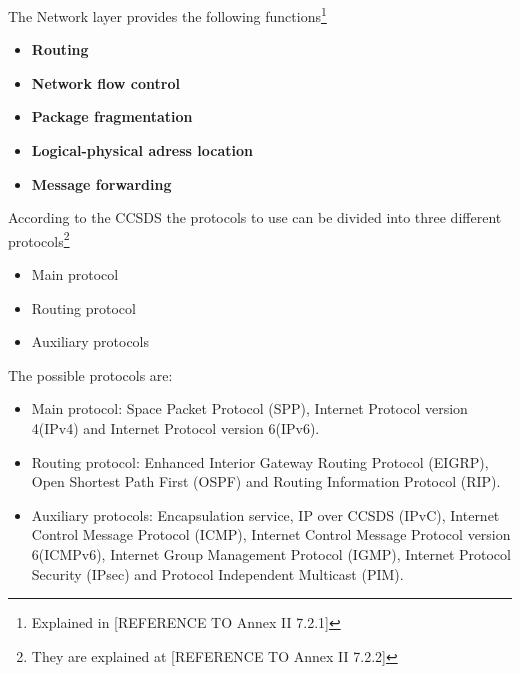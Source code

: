 The Network layer provides the following functions\footnote{Explained in [REFERENCE TO Annex II 7.2.1]}

\begin{itemize}
\item \textbf{Routing}
\item \textbf{Network flow control}
\item \textbf{Package fragmentation}
\item \textbf{Logical-physical adress location}
\item \textbf{Message forwarding}
\end{itemize}

According to the CCSDS the protocols to use can be divided into three different protocols\footnote{They are explained at [REFERENCE TO Annex II 7.2.2]} 

\begin{itemize}
\item Main protocol
\item Routing protocol
\item Auxiliary protocols
\end{itemize}

The possible protocols are:

\begin{itemize}
\item Main protocol: Space Packet Protocol (SPP), Internet Protocol version 4(IPv4) and Internet Protocol version 6(IPv6).
\item Routing protocol: Enhanced Interior Gateway Routing Protocol (EIGRP), Open Shortest Path First (OSPF) and Routing Information Protocol (RIP).
\item Auxiliary protocols: Encapsulation service, IP over CCSDS (IPvC), Internet Control Message Protocol (ICMP), Internet Control Message Protocol version 6(ICMPv6), Internet Group Management Protocol (IGMP), Internet Protocol Security (IPsec) and Protocol Independent Multicast (PIM).
\end{itemize}

